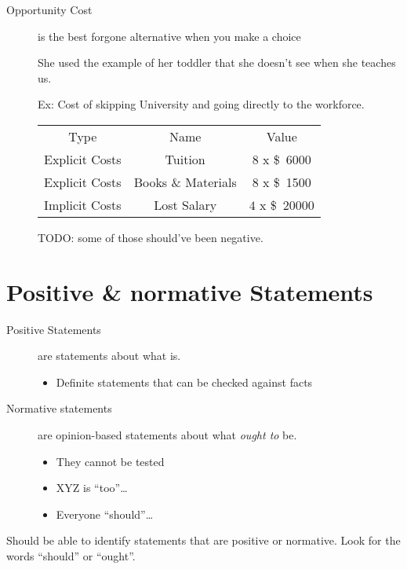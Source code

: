 \begin{enumerate}
                    \begin{description}
                        \item[Opportunity Cost] is the best forgone alternative when you make a choice

                            She used the example of her toddler that she doesn't see when she teaches us.

                            Ex:
                            Cost of skipping University and going directly to the workforce.

                            \begin{tabular}{c|c|c}
                                Type & Name & Value \\ \hrulefill
                                Explicit Costs & Tuition & $8$ x \SI{6000}[\$]{} \\
                                Explicit Costs & Books \& Materials & $8$ x \SI{1500}[\$]{} \\
                                Implicit Costs & Lost Salary        & $4$ x \SI{20000}[\$]{} \\
                            \end{tabular}

                            TODO: some of those should've been negative.
                    \end{description}
            \end{enumerate}

            \section{Positive \& normative Statements} %
            \label{sec:positive_&_normative_statements}
                \begin{description}
                    \item[Positive Statements] are statements about what is.
                        \begin{itemize}
                            \item Definite statements that can be checked against facts
                        \end{itemize}
                    \item[Normative statements] are opinion-based statements about what \emph{ought to} be.
                        \begin{itemize}
                            \item They cannot be tested
                            \item XYZ is ``too''\ldots
                            \item Everyone ``should''\ldots
                        \end{itemize}
                \end{description}
                Should be able to identify statements that are positive or normative.
                Look for the words ``should'' or ``ought''.

